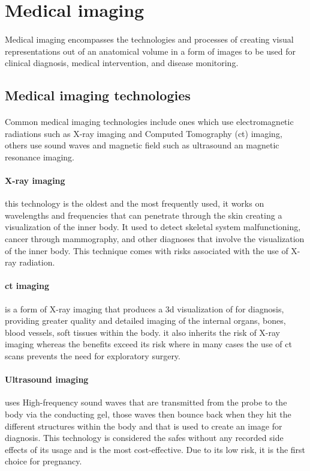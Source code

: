 \section{Medical imaging}
\paragraph{}
Medical imaging encompasses the technologies and processes of creating visual representations out of an anatomical volume in a form of images to be used for clinical diagnosis, medical intervention, and disease monitoring.
\subsection{Medical imaging technologies}
\paragraph{}
Common medical imaging technologies include ones which use electromagnetic radiations such as X-ray imaging and Computed Tomography (\acs{ct}) imaging, others use sound waves and magnetic field such as ultrasound an magnetic resonance imaging.
\paragraph{X-ray imaging}
this technology is the oldest and the most frequently used, it works on wavelengths and frequencies that can penetrate through the skin creating a visualization of the inner body. It used to detect skeletal system malfunctioning, cancer through mammography, and other diagnoses that involve the visualization of the inner body. This technique comes with risks associated with the use of X-ray radiation.
\paragraph{\acs{ct} imaging}
is a form of X-ray imaging that produces a \acs{3d} visualization of for diagnosis, providing greater quality and detailed imaging of the internal organs, bones, blood vessels, soft tissues within the body.
it also inherits the risk of X-ray imaging whereas the benefits exceed its risk where in many cases the use of \acs{ct} scans prevents the need for exploratory surgery.
\paragraph{Ultrasound imaging}
uses High-frequency sound waves that are transmitted from the probe to the body via the conducting gel, those waves then bounce back when they hit the different structures within the body and that is used to create an image for diagnosis.
This technology is considered the safes without any recorded side effects of its usage and is the most cost-effective. Due to its low risk, it is the first choice for pregnancy.
